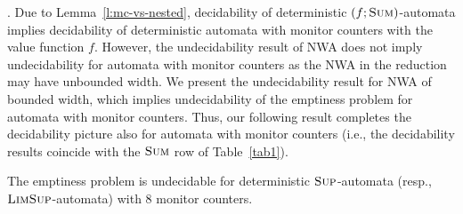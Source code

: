 \documentclass{lmcs}
\newcommand{\fsum}{\textsc{Sum}}
\newcommand{\flimsup}{\textsc{LimSup}}
\newcommand{\fsup}{\textsc{Sup}}
\begin{document}
\smallskip{}.
Due to Lemma~\ref{l:mc-vs-nested},
decidability of deterministic $(f;\fsum)$-automata implies decidability of
deterministic automata with monitor counters with the value function $f$.
However, the undecidability result of NWA does not imply undecidability for
automata with monitor counters as the NWA in the reduction may have unbounded width.
We present the undecidability result for NWA of bounded width, which implies undecidability of the emptiness problem for automata with monitor counters.
Thus, our following result completes the decidability picture also for automata with monitor counters
(i.e., the decidability results coincide with the $\fsum$ row of Table~\ref{tab1}).

\begin{thm}\label{th:undecidable-limsup}
The emptiness problem is undecidable for deterministic $\fsup$-automata (resp., $\flimsup$-automata) with $8$ monitor counters.
\end{thm}
\end{document}
